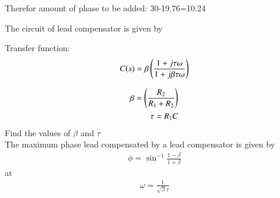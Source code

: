 Therefor amount of phase to be added: 30-19.76=10.24





The circuit of lead compensator is given by
\begin{figure}[!ht]
    \centering
	\resizebox{\columnwidth}{!}{}
\caption{}
\label{fig:ee18btech11036_ckt}
\end{figure}

Transfer function:
\begin{align}
C(s)=\beta\left(\frac{1+j\tau\omega}{1+j\beta\tau\omega}\right)
\label{eq:ee18btech11036_compensator}
\end{align}

\begin{align}
\beta=\left(\frac{R_2}{R_1+R_2}\right)\\
\tau =R_1C
\label{eq:ee18btech11036_values}
\end{align}
Find the values of $\beta$ and $\tau$\\
\solution The maximum phase lead compensated by a lead compensator is given by\\
\begin{align}
\phi={\sin}^{-1}\frac{1-\beta}{1+\beta}
\label{eq:ee18btech11036_beta}
\end{align}
at
\begin{align}
\omega =\frac{1}{\sqrt{\beta}\tau}
\label{eq:ee18btech11036_omega}
\end{align}

